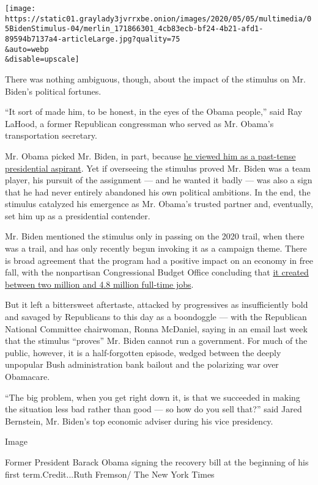 \texttt{[image: https://static01.graylady3jvrrxbe.onion/images/2020/05/05/multimedia/05BidenStimulus-04/merlin\_171866301\_4cb83ecb-bf24-4b21-afd1-89594b7137a4-articleLarge.jpg?quality=75\\\&auto=webp\\\&disable=upscale]}

There was nothing ambiguous, though, about the impact of the stimulus on
Mr. Biden's political fortunes.

``It sort of made him, to be honest, in the eyes of the Obama people,''
said Ray LaHood, a former Republican congressman who served as Mr.
Obama's transportation secretary.

Mr. Obama picked Mr. Biden, in part, because
\href{https://www.nytimes3xbfgragh.onion/2019/08/16/us/politics/biden-obama-history.html}{he
viewed him as a past-tense presidential aspirant}. Yet if overseeing the
stimulus proved Mr. Biden was a team player, his pursuit of the
assignment --- and he wanted it badly --- was also a sign that he had
never entirely abandoned his own political ambitions. In the end, the
stimulus catalyzed his emergence as Mr. Obama's trusted partner and,
eventually, set him up as a presidential contender.

Mr. Biden mentioned the stimulus only in passing on the 2020 trail, when
there was a trail, and has only recently begun invoking it as a campaign
theme. There is broad agreement that the program had a positive impact
on an economy in free fall, with the nonpartisan Congressional Budget
Office concluding that \href{https://www.cbo.gov/publication/25099}{it
created between two million and 4.8 million full-time jobs}.

But it left a bittersweet aftertaste, attacked by progressives as
insufficiently bold and savaged by Republicans to this day as a
boondoggle --- with the Republican National Committee chairwoman, Ronna
McDaniel, saying in an email last week that the stimulus ``proves'' Mr.
Biden cannot run a government. For much of the public, however, it is a
half-forgotten episode, wedged between the deeply unpopular Bush
administration bank bailout and the polarizing war over Obamacare.

``The big problem, when you get right down it, is that we succeeded in
making the situation less bad rather than good --- so how do you sell
that?'' said Jared Bernstein, Mr. Biden's top economic adviser during
his vice presidency.

Image

Former President Barack Obama signing the recovery bill at the beginning
of his first term.Credit...Ruth Fremson/ The New York Times

